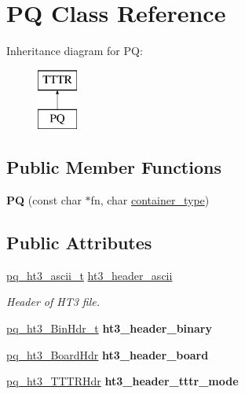 \hypertarget{class_p_q}{}\section{PQ Class Reference}
\label{class_p_q}
Inheritance diagram for PQ\+:\begin{figure}[H]
\begin{center}
\leavevmode
\includegraphics[height=2.000000cm]{class_p_q}
\end{center}
\end{figure}
\subsection*{Public Member Functions}
\begin{DoxyCompactItemize}
\item 
\mbox{\label{class_p_q_a83b4a4aeac534cd488ea9a0808d6f51f}} 
{\bfseries PQ} (const char $\ast$fn, char \hyperlink{class_t_t_t_r_ac87c90e2c9d38d5ad4cf64f51dcaab23}{container\+\_\+type})
\end{DoxyCompactItemize}
\subsection*{Public Attributes}
\begin{DoxyCompactItemize}
\item 
\mbox{\label{class_p_q_a44cbafe0c0ddd72f87711927977a2d64}} 
\hyperlink{structpq__ht3__ascii__t}{pq\+\_\+ht3\+\_\+ascii\+\_\+t} \hyperlink{class_p_q_a44cbafe0c0ddd72f87711927977a2d64}{ht3\+\_\+header\+\_\+ascii}
\begin{DoxyCompactList}\small\item\em Header of H\+T3 file. \end{DoxyCompactList}\item 
\mbox{\label{class_p_q_acd33ed3efe53e1fcbc36872f60ffe57f}} 
\hyperlink{structpq__ht3___bin_hdr__t}{pq\+\_\+ht3\+\_\+\+Bin\+Hdr\+\_\+t} {\bfseries ht3\+\_\+header\+\_\+binary}
\item 
\mbox{\label{class_p_q_ad40b63460488fa1535aa884bbff4220e}} 
\hyperlink{structpq__ht3___board_hdr}{pq\+\_\+ht3\+\_\+\+Board\+Hdr} {\bfseries ht3\+\_\+header\+\_\+board}
\item 
\mbox{\label{class_p_q_a9f3acf676b83ea0527aa967a9204dc27}} 
\hyperlink{structpq__ht3___t_t_t_r_hdr}{pq\+\_\+ht3\+\_\+\+T\+T\+T\+R\+Hdr} {\bfseries ht3\+\_\+header\+\_\+tttr\+\_\+mode}
\end{DoxyCompactItemize}
